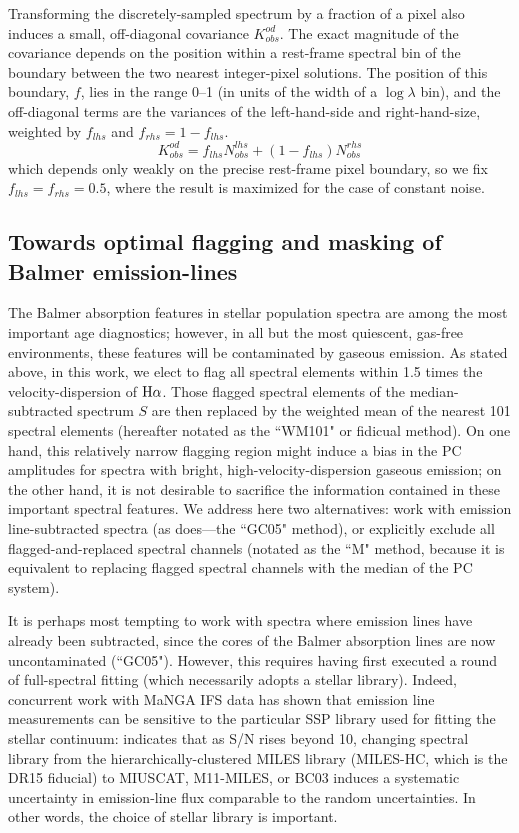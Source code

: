 Transforming the discretely-sampled spectrum by a fraction of a pixel also induces a small, off-diagonal covariance $K_{obs}^{od}$. The exact magnitude of the covariance depends on the position within a rest-frame spectral bin of the boundary between the two nearest integer-pixel solutions. The position of this boundary, $f$, lies in the range 0--1 (in units of the width of a $\log \lambda$ bin), and the off-diagonal terms are the variances of the left-hand-side and right-hand-size, weighted by $f_{lhs}$ and $f_{rhs} = 1 - f_{lhs}$.
%
\begin{equation}
    K_{obs}^{od} = f_{lhs} N_{obs}^{lhs} + (1 - f_{lhs}) N_{obs}^{rhs}
\end{equation}
%
which depends only weakly on the precise rest-frame pixel boundary, so we fix $f_{lhs} = f_{rhs} = 0.5$, where the result is maximized for the case of constant noise.

\subsection{Towards optimal flagging and masking of Balmer emission-lines}
\label{chap1:subsec:balmer}

The Balmer absorption features in stellar population spectra are among the most important age diagnostics; however, in all but the most quiescent, gas-free environments, these features will be contaminated by gaseous emission. As stated above, in this work, we elect to flag all spectral elements within 1.5 times the velocity-dispersion of ${\rm H\alpha}$. Those flagged spectral elements of the median-subtracted spectrum $S$ are then replaced by the weighted mean of the nearest 101 spectral elements (hereafter notated as the ``WM101" or fidicual method). On one hand, this relatively narrow flagging region might induce a bias in the PC amplitudes for spectra with bright, high-velocity-dispersion gaseous emission; on the other hand, it is not desirable to sacrifice the information contained in these important spectral features. We address here two alternatives: work with emission line-subtracted spectra (as \citealt{gallazzi_charlot_05} does---the ``GC05" method), or explicitly exclude all flagged-and-replaced spectral channels (notated as the ``M" method, because it is equivalent to replacing flagged spectral channels with the median of the PC system).

It is perhaps most tempting to work with spectra where emission lines have already been subtracted, since the cores of the Balmer absorption lines are now uncontaminated (``GC05"). However, this requires having first executed a round of full-spectral fitting (which necessarily adopts a stellar library). Indeed, concurrent work with MaNGA IFS data has shown that emission line measurements can be sensitive to the particular SSP library used for fitting the stellar continuum: \citet[][Figure 9]{belfiore_19_dap-elines} indicates that as S/N rises beyond 10, changing spectral library from the hierarchically-clustered MILES library (MILES-HC, which is the DR15 fiducial) to MIUSCAT, M11-MILES, or BC03 induces a systematic uncertainty in emission-line flux comparable to the random uncertainties. In other words, the choice of stellar library is important.

